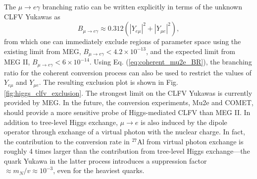 \documentclass[12pt,letterpaper]{book}
\begin{document}
The $\mu\rightarrow e\gamma$ branching ratio can be written explicitly in terms of the unknown CLFV Yukawas as
\begin{equation}
B_{\mu\rightarrow e\gamma}\approx 0.312\left(|Y_{e\mu}|^2+|Y_{\mu e}|^2\right),
\end{equation}
from which one can immediately exclude regions of parameter space using the existing limit from MEG, $B_{\mu\rightarrow e\gamma}<4.2\times 10^{-13}$, and the expected limit from MEG II, $B_{\mu\rightarrow e\gamma}<6\times 10^{-14}$. Using Eq. (\ref{eq:coherent_mu2e_BR}), the branching ratio for the coherent conversion process can also be used to restrict the values of $Y_{e\mu}$ and $Y_{\mu e}$. The resulting exclusion plot is shown in Fig. \ref{fig:higgs_clfv_exclusion}. The strongest limit on the CLFV Yukawas is currently provided by MEG. In the future, the conversion experiments, Mu2e and COMET, should provide a more sensitive probe of Higgs-mediated CLFV than MEG II. In addition to tree-level Higgs exchange, $\mu\rightarrow e$ is also induced by the dipole operator through exchange of a virtual photon with the nuclear charge. In fact, the contribution to the conversion rate in $^{27}$Al from virtual photon exchange is roughly 4 times larger than the contribution from tree-level Higgs exchange---the quark Yukawa in the latter process introduces a suppression factor $\approx m_N/v\approx 10^{-3}$, even for the heaviest quarks. 
\end{document}
